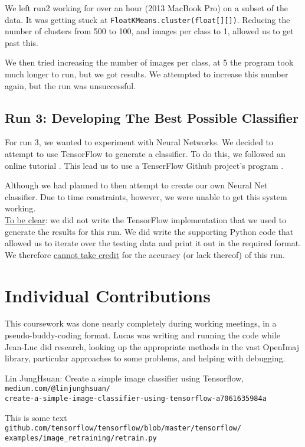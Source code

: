\documentclass[a4paper,12pt]{article}
\begin{document}
We left run2 working for over an hour (2013 MacBook Pro) on a subset of the data. It was getting stuck at \texttt{FloatKMeans.cluster(float[][])}. Reducing the number of clusters from 500 to 100, and images per class to 1, allowed us to get past this.

We then tried increasing the number of images per class, at 5 the program took much longer to run, but we got results. We attempted to increase this number again, but the run was unsuccessful.

\subsection{Run 3: Developing The Best Possible Classifier}

For run 3, we wanted to experiment with Neural Networks. We decided to attempt to use TensorFlow to generate a classifier. To do this, we followed an online tutorial \cite{tutorial}. This lead us to use a TenserFlow Github project's program \cite{github}.

Although we had planned to then attempt to create our own Neural Net classifier. Due to time constraints, however, we were unable to get this system working.\\


\underline{To be clear}: we did not write the TensorFlow implementation that we used to generate the results for this run. We did write the supporting Python code that allowed us to iterate over the testing data and print it out in the required format. We therefore \underline{cannot take credit} for the accuracy (or lack thereof) of this run.

\section{Individual Contributions}
This coursework was done nearly completely during working meetings, in a pseudo-buddy-coding format. Lucas was writing and running the code while Jean-Luc did research, looking up the appropriate methods in the vast OpenImaj library, particular approaches to some problems, and helping with debugging.

\begin{thebibliography}{9}
Lin JungHsuan: Create a simple image classifier using Tensorflow,
\\\texttt{medium.com/@linjunghsuan/ \\
create-a-simple-image-classifier-using-tensorflow-a7061635984a}

This is some text
\texttt{github.com/tensorflow/tensorflow/blob/master/tensorflow/ \\
examples/image\_retraining/retrain.py}
\end{thebibliography}
\end{document}
